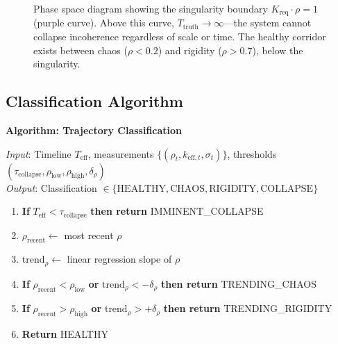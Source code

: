 \documentclass[11pt,a4paper]{article}
\theoremstyle{definition}
\theoremstyle{remark}
\newcommand{\Kreq}{K_{\text{req}}}
\newcommand{\Ttruth}{T_{\text{truth}}}
\newcommand{\Teff}{T_{\text{eff}}}
\begin{document}
\begin{figure}[H]
\caption{Phase space diagram showing the singularity boundary $\Kreq \cdot \rho = 1$ (purple curve). Above this curve, $\Ttruth \to \infty$---the system cannot collapse incoherence regardless of scale or time. The healthy corridor exists between chaos ($\rho < 0.2$) and rigidity ($\rho > 0.7$), below the singularity.}
\label{fig:phase-space}
\end{figure}

\subsection{Classification Algorithm}

\noindent\textbf{Algorithm: Trajectory Classification}

\noindent\textit{Input}: Timeline $\Teff$, measurements $\{(\rho_t, k_{\text{eff},t}, \sigma_t)\}$, thresholds $(\tau_{\text{collapse}}, \rho_{\text{low}}, \rho_{\text{high}}, \delta_\rho)$\\
\textit{Output}: Classification $\in \{\text{HEALTHY}, \text{CHAOS}, \text{RIGIDITY}, \text{COLLAPSE}\}$

\begin{enumerate}[noitemsep]
    \item \textbf{If} $\Teff < \tau_{\text{collapse}}$ \textbf{then return} IMMINENT\_COLLAPSE
    \item $\rho_{\text{recent}} \gets$ most recent $\rho$
    \item $\text{trend}_\rho \gets$ linear regression slope of $\rho$
    \item \textbf{If} $\rho_{\text{recent}} < \rho_{\text{low}}$ \textbf{or} $\text{trend}_\rho < -\delta_\rho$ \textbf{then return} TRENDING\_CHAOS
    \item \textbf{If} $\rho_{\text{recent}} > \rho_{\text{high}}$ \textbf{or} $\text{trend}_\rho > +\delta_\rho$ \textbf{then return} TRENDING\_RIGIDITY
    \item \textbf{Return} HEALTHY
\end{enumerate}
\end{document}
